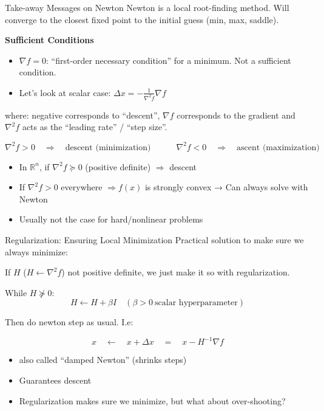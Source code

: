 \begin{frame}{Take-away Messages on Newton}
Newton is a local root-finding method. Will converge to the closest fixed point to the initial guess (min, max, saddle). 

\textbf{Sufficient Conditions}
\begin{itemize}
    \item $\nabla f = 0$: “first-order necessary condition” for a minimum. Not a sufficient condition.
    \item  Let’s look at scalar case: $\Delta x = -\frac{1}{\nabla^2 f}\nabla f$
\end{itemize} 
where: negative corresponds to “descent”, $\nabla f$ corresponds to the gradient and $\nabla^2 f$ acts as the “leading rate” / “step size”.

$\nabla^2 f > 0 \quad \Rightarrow \quad \text{descent (minimization)} \quad \quad \quad \nabla^2 f < 0 \quad \Rightarrow \quad \text{ascent (maximization)}$
\begin{itemize}
    \item In $\mathbb{R}^n$, if $\nabla^2 f \succeq 0$ (positive definite) $\Rightarrow$ descent
    \item If $\nabla^2 f > 0$ everywhere $\Rightarrow f(x)$ is strongly convex → Can always solve with Newton
    \item Usually not the case for hard/nonlinear problems
\end{itemize}
 \end{frame}

\begin{frame}{Regularization: Ensuring Local Minimization}
Practical solution to make sure we always minimize:
 
If $H$ ($H \leftarrow \nabla^2 f$) not positive definite, we just make it so with regularization.


While $H \not\succeq 0$:
$$H \leftarrow H + \beta I \quad (\beta > 0 \ \text{scalar hyperparameter})$$
 
Then do newton step as usual. I.e:

$$
x \quad \leftarrow \quad  x + \Delta x \quad  = \quad x  -H^{-1}\nabla f
$$

\begin{itemize}
    \item also called “damped Newton” (shrinks steps)
    \item Guarantees descent
    \item Regularization makes sure we minimize, but what about over-shooting?
\end{itemize} 
\end{frame}

